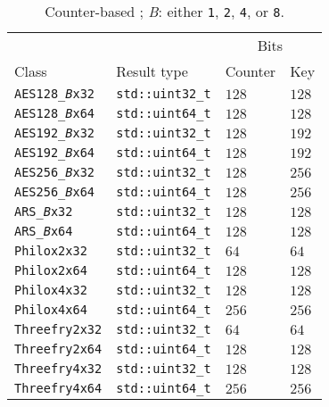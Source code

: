 \begin{table}
  \def\B{\textcolor{MRed}{\textit{B}}}
  \def\V{\textcolor{MRed}{\textit{V}}}
  \begin{tabularx}{\textwidth}{XXll}
    \toprule
    & & \multicolumn{2}{c}{Bits} \\
    \cmidrule{3-4}
    Class & Result type & Counter & Key \\
    \midrule
    \texttt{AES128\_\B x32} & \verb|std::uint32_t| & $128$ & $128$ \\
    \texttt{AES128\_\B x64} & \verb|std::uint64_t| & $128$ & $128$ \\
    \texttt{AES192\_\B x32} & \verb|std::uint32_t| & $128$ & $192$ \\
    \texttt{AES192\_\B x64} & \verb|std::uint64_t| & $128$ & $192$ \\
    \texttt{AES256\_\B x32} & \verb|std::uint32_t| & $128$ & $256$ \\
    \texttt{AES256\_\B x64} & \verb|std::uint64_t| & $128$ & $256$ \\
    \texttt{ARS\_\B x32}    & \verb|std::uint32_t| & $128$ & $128$ \\
    \texttt{ARS\_\B x64}    & \verb|std::uint64_t| & $128$ & $128$ \\
    \texttt{Philox2x32}     & \verb|std::uint32_t| & $64$  & $64$  \\
    \texttt{Philox2x64}     & \verb|std::uint64_t| & $128$ & $128$ \\
    \texttt{Philox4x32}     & \verb|std::uint32_t| & $128$ & $128$ \\
    \texttt{Philox4x64}     & \verb|std::uint64_t| & $256$ & $256$ \\
    \texttt{Threefry2x32}   & \verb|std::uint32_t| & $64$  & $64$  \\
    \texttt{Threefry2x64}   & \verb|std::uint64_t| & $128$ & $128$ \\
    \texttt{Threefry4x32}   & \verb|std::uint32_t| & $128$ & $128$ \\
    \texttt{Threefry4x64}   & \verb|std::uint64_t| & $256$ & $256$ \\
    \bottomrule
  \end{tabularx}
  \caption{Counter-based \rng; \B: either \texttt{1}, \texttt{2}, \texttt{4},
    or \texttt{8}.}
  \label{tab:Counter-based RNG}
\end{table}

